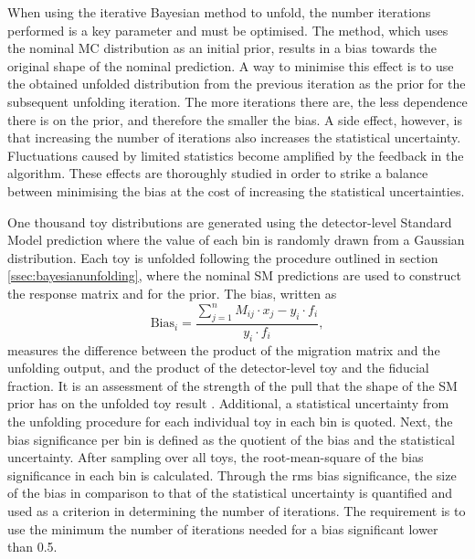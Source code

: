 When using the iterative Bayesian method to unfold, the number iterations performed is a key parameter and must be optimised. The method, which uses the nominal MC distribution as an initial prior, results in a bias towards the original shape of the nominal prediction. A way to minimise this effect is to use the obtained unfolded distribution from the previous iteration as the prior for the subsequent unfolding iteration. The more iterations there are, the less dependence there is on the prior, and therefore the smaller the bias. A side effect, however, is that increasing the number of iterations also increases the statistical uncertainty. Fluctuations caused by limited statistics become amplified by the feedback in the algorithm. These effects are thoroughly studied in order to strike a balance between minimising the bias at the cost of increasing the statistical uncertainties.

One thousand toy distributions are generated using the detector-level Standard Model prediction where the value of each bin is randomly drawn from a Gaussian distribution. Each toy is unfolded following the procedure outlined in section \ref{ssec:bayesianunfolding}, where the nominal SM predictions are used to construct the response matrix and for the prior. The bias, written as
\begin{equation} \label{eq:unfbias}
    \text{Bias}_i=\dfrac{\sum_{j=1}^nM_{ij}\cdot x_j-y_i\cdot f_i}{y_i\cdot f_i},
\end{equation}
measures the difference between the product of the migration matrix and the unfolding output, and the product of the detector-level toy and the fiducial fraction. It is an assessment of the strength of the pull that the shape of the SM prior has on the unfolded toy result . Additional, a statistical uncertainty from the unfolding procedure for each individual toy in each bin is quoted. Next, the bias significance per bin is defined as the quotient of the bias and the statistical uncertainty. After sampling over all toys, the root-mean-square of the bias significance in each bin is calculated. Through the rms bias significance, the size of the bias in comparison to that of the statistical uncertainty is quantified and used as a criterion in determining the number of iterations. The requirement is to use the minimum the number of iterations needed for a bias significant lower than 0.5.


